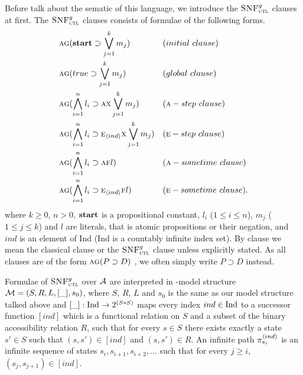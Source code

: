 \documentclass{article}
\begin{document}
Before talk about the sematic of this language, we introduce the ${\textsc{SNF}_{\textsc{ctl}}^g}$ clauses at first. The ${\textsc{SNF}_{\textsc{ctl}}^g}$ clauses consists of formulae of the following forms.
\begin{align*}
& \ALL \GLOBAL(\start \supset \bigvee_{j=1}^k m_j) && (initial\ clause) \\
& \ALL \GLOBAL(true \supset \bigvee_{j=1}^k m_j) && (global\ clause) \\
& \ALL \GLOBAL(\bigwedge_{i=1}^n l_i \supset \ALL \NEXT \bigvee_{j=1}^k m_j) && (\ALL-step\ clause)\\
& \ALL \GLOBAL(\bigwedge_{i=1}^n l_i \supset \EXIST_\tuple{ind} \NEXT \bigvee_{j=1}^k m_j) && (\EXIST-step\ clause)\\
& \ALL \GLOBAL(\bigwedge_{i=1}^n l_i \supset \ALL \FUTURE l) && (\ALL-sometime\ clause)\\
& \ALL \GLOBAL(\bigwedge_{i=1}^n l_i \supset \EXIST_{\tuple{ind}} \FUTURE l) && (\EXIST-sometime\ clause).
\end{align*}
where $k \ge 0$, $n > 0$, $\textbf{start}$ is a propositional constant, $l_i$ ($1 \le i \le n$), $m_j$ ($1 \le j \le k$) and $l$ are literals, that is atomic propositions or their negation, and $ind$ is an element of Ind (Ind is a countably infinite index set).
By clause we mean the classical clause or the ${\textsc{SNF}_{\textsc{ctl}}^g}$ clause unless explicitly stated.
As all clauses are of the form $\textsc{a} \textsc{g}(P \supset D)$ , we often simply write $P \supset D$ instead.

Formulae of ${\textsc{SNF}_{\textsc{ctl}}^g}$ over ${\cal A}$ are interpreted in \Ind-model structure ${\cal M}=(S,R,L, [\_], s_0)$, where $S$, $R$, $L$ and $s_0$ is the same as our model structure talked above and $[\_]: \textrm{Ind} \rightarrow 2^{(S*S)}$ maps every index $ind \in \textrm{Ind}$ to a successor function $[ind]$ which is a functional relation on $S$ and a subset of the binary accessibility relation $R$, such that for every $s\in S$ there exists exactly a state $s'\in S$ such that $(s,s')\in [ind]$ and $(s,s')\in R$.
An infinite path $\pi_{s_i}^{{\langle{ind}\rangle}}$ is an infinite sequence of states $s_i, s_{i+1}, s_{i+2},\dots$ such that for every $j\geq i$, $(s_j, s_{j+1})\in [ind]$.
\end{document}
